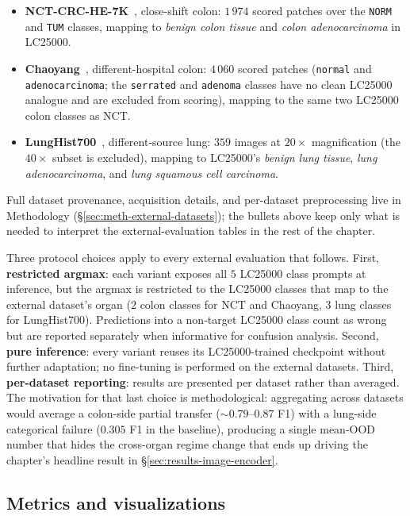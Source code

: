 \begin{itemize}
    \item \textbf{NCT-CRC-HE-7K}~\cite{kather2019nct}, close-shift colon: $1\,974$ scored patches over the \texttt{NORM} and \texttt{TUM} classes, mapping to \emph{benign colon tissue} and \emph{colon adenocarcinoma} in LC25000.
    \item \textbf{Chaoyang}~\cite{zhu2021chaoyang}, different-hospital colon: $4\,060$ scored patches (\texttt{normal} and \texttt{adenocarcinoma}; the \texttt{serrated} and \texttt{adenoma} classes have no clean LC25000 analogue and are excluded from scoring), mapping to the same two LC25000 colon classes as NCT.
    \item \textbf{LungHist700}~\cite{tabatabaei2024lunghist}, different-source lung: $359$ images at $20\times$ magnification (the $40\times$ subset is excluded), mapping to LC25000's \emph{benign lung tissue}, \emph{lung adenocarcinoma}, and \emph{lung squamous cell carcinoma}.
\end{itemize}

Full dataset provenance, acquisition details, and per-dataset preprocessing live in Methodology (§\ref{sec:meth-external-datasets}); the bullets above keep only what is needed to interpret the external-evaluation tables in the rest of the chapter.

Three protocol choices apply to every external evaluation that follows. First, \textbf{restricted argmax}: each variant exposes all $5$ LC25000 class prompts at inference, but the argmax is restricted to the LC25000 classes that map to the external dataset's organ ($2$ colon classes for NCT and Chaoyang, $3$ lung classes for LungHist700). Predictions into a non-target LC25000 class count as wrong but are reported separately when informative for confusion analysis. Second, \textbf{pure inference}: every variant reuses its LC25000-trained checkpoint without further adaptation; no fine-tuning is performed on the external datasets. Third, \textbf{per-dataset reporting}: results are presented per dataset rather than averaged. The motivation for that last choice is methodological: aggregating across datasets would average a colon-side partial transfer ($\sim 0.79$--$0.87$ F1) with a lung-side categorical failure ($0.305$ F1 in the baseline), producing a single mean-OOD number that hides the cross-organ regime change that ends up driving the chapter's headline result in §\ref{sec:results-image-encoder}.

\subsection{Metrics and visualizations}
\label{sec:results-metrics}

